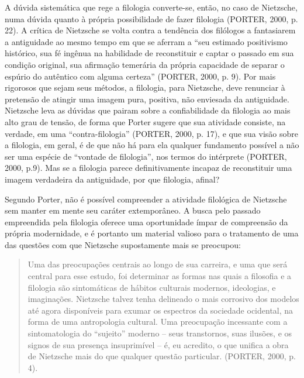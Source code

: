 \documentclass[
	12pt,				%
	openright,			%
	oneside,			%
	a4paper,			%
	english,			%
	french,				%
	spanish,			%
	brazil				%
	]{abntex2}
\begin{document}
	A dúvida sistemática que rege a filologia converte-se, então, no caso de Nietzsche, numa dúvida quanto à própria possibilidade de fazer filologia (PORTER, 2000, p. 22). A crítica de Nietzsche se volta contra a tendência dos filólogos a fantasiarem a antiguidade ao mesmo tempo em que se aferram a “seu estimado positivismo histórico, sua fé ingênua na habilidade de reconstituir e captar o passado em sua condição original, sua afirmação temerária da própria capacidade de separar o espúrio do autêntico com alguma certeza” (PORTER, 2000, p. 9). Por mais rigorosos que sejam seus métodos, a filologia, para Nietzsche, deve renunciar à pretensão de atingir uma imagem pura, positiva, não enviesada da antiguidade. Nietzsche leva as dúvidas que pairam sobre a confiabilidade da filologia ao mais alto grau de tensão, de forma que Porter sugere que sua atividade consiste, na verdade, em uma “contra-filologia” (PORTER, 2000, p. 17), e que sua visão sobre a filologia, em geral, é de que não há para ela qualquer fundamento possível a não ser uma espécie de “vontade de filologia”, nos termos do intérprete (PORTER, 2000, p.9). Mas se a filologia parece definitivamente incapaz de reconstituir uma imagem verdadeira da antiguidade, por que filologia, afinal? 

Segundo Porter, não é possível compreender a atividade filológica de Nietzsche sem manter em mente seu caráter extemporâneo. A busca pelo passado empreendida pela filologia oferece uma oportunidade ímpar de compreensão da própria modernidade, e é portanto um material valioso para o tratamento de uma das questões com que Nietzsche supostamente mais se preocupou:

\begin{quotation}
Uma das preocupações centrais ao longo de sua carreira, e uma que será central para esse estudo, foi determinar as formas nas quais a filosofia e a filologia são sintomáticas de hábitos culturais modernos, ideologias, e imaginações. Nietzsche talvez tenha delineado o mais corrosivo dos modelos até agora disponíveis para exumar os espectros da sociedade ocidental, na forma de uma antropologia cultural. Uma preocupação incessante com a sintomatologia do “sujeito” moderno – seus transtornos, suas ilusões, e os signos de sua presença insuprimível – é, eu acredito, o que unifica a obra de Nietzsche mais do que qualquer questão particular. (PORTER, 2000, p. 4).
\end{quotation}
\end{document}
